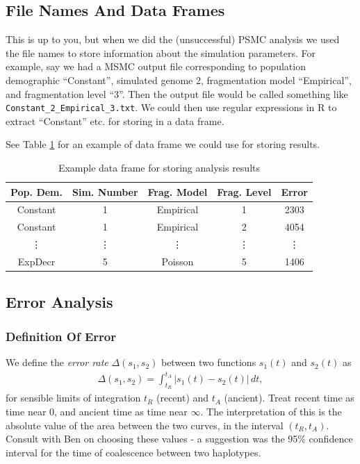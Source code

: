\documentclass[11pt,a4paper]{article}
\begin{document}
\subsection{File Names And Data Frames}
This is up to you, but when we did the (unsuccessful) PSMC analysis we used the file names to store information about the simulation parameters. For example, say we had a MSMC output file corresponding to population demographic ``Constant'', simulated genome 2, fragmentation model ``Empirical'', and fragmentation level ``3''. Then the output file would be called something like \texttt{Constant\_2\_Empirical\_3.txt}. We could then use regular expressions in R to extract ``Constant'' etc. for storing in a data frame.

See Table \ref{df} for an example of data frame we could use for storing results.
\begin{table}[h]
	\caption{Example data frame for storing analysis results}
	\begin{center}
		\begin{tabular}{ccccc}
			\hline
			\textbf{Pop. Dem.} & \textbf{Sim. Number} & \textbf{Frag. Model} & \textbf{Frag. Level} & \textbf{Error} \\
                        \hline
                        Constant & 1 & Empirical & 1 & 2303 \\
                        Constant & 1 & Empirical & 2 & 4054 \\
                        \vdots & \vdots & \vdots & \vdots & \vdots \\
                        ExpDecr & 5 & Poisson & 5 & 1406 \\ \hline
		\end{tabular}
	\end{center} \label{df}
\end{table}


\subsection{Error Analysis}

\subsubsection{Definition Of Error}
We define the \emph{error rate} $\Delta (s_1,s_2)$ between two functions $s_1(t)$ and $s_2(t)$ as 
\begin{eqnarray}
\Delta (s_1,s_2) = \int_{t_R}^{t_A} |s_1(t)-s_2(t)| \,dt, \label{errorRate}
\end{eqnarray}
for sensible limits of integration $t_R$ (recent) and $t_A$ (ancient). Treat recent time as time near 0, and ancient time as time near $\infty$. The interpretation of this is the absolute value of the area between the two curves, in the interval $(t_R,t_A)$. Consult with Ben on choosing these values - a suggestion was the 95\% confidence interval for the time of coalescence between two haplotypes.
\end{document}
